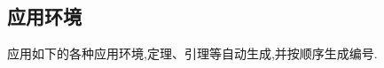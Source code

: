 \documentclass{ctacn}%
\begin{document}
\tableofcontents
\newpage
\begin{multicols}{2}





























\section{应用环境}
应用如下的各种应用环境,定理、引理等自动生成,并按顺序生成编号.











\end{multicols}
\end{document}
